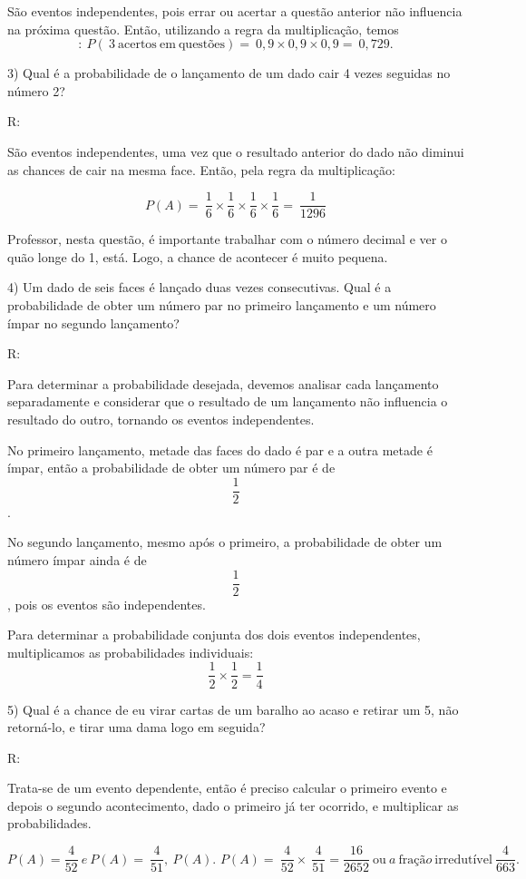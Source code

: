 São eventos independentes, pois errar ou acertar a questão anterior não
influencia na próxima questão. Então, utilizando a regra da
multiplicação, temos
\[:\ P(\ 3\ \text{acertos}\ \text{em}\ \text{quest}õ\text{es}) = \ 0,9 \times 0,9 \times 0,9 = \ 0,729.\]

3) Qual é a probabilidade de o lançamento de um dado cair 4 vezes
seguidas no número 2?

R:

São eventos independentes, uma vez que o resultado anterior do dado não
diminui as chances de cair na mesma face. Então, pela regra da
multiplicação:

\[P(A) = \ \frac{1}{6} \times \frac{1}{6} \times \frac{1}{6} \times \frac{1}{6} = \ \frac{1}{1296}\]

Professor, nesta questão, é importante trabalhar com o número decimal e
ver o quão longe do 1, está. Logo, a chance de acontecer é muito
pequena.

4) Um dado de seis faces é lançado duas vezes consecutivas. Qual é a
probabilidade de obter um número par no primeiro lançamento e um número
ímpar no segundo lançamento?

R:

Para determinar a probabilidade desejada, devemos analisar cada
lançamento separadamente e considerar que o resultado de um lançamento
não influencia o resultado do outro, tornando os eventos independentes.

No primeiro lançamento, metade das faces do dado é par e a outra metade
é ímpar, então a probabilidade de obter um número par é de
\[\frac {1}{2}\].

No segundo lançamento, mesmo após o primeiro, a probabilidade de obter
um número ímpar ainda é de \[\frac {1}{2}\], pois os eventos são
independentes.

Para determinar a probabilidade conjunta dos dois eventos independentes,
multiplicamos as probabilidades individuais:
\[\frac {1}{2} \times \frac {1}{2} = \frac {1}{4}\]

5) Qual é a chance de eu virar cartas de um baralho ao acaso e retirar
um 5, não retorná-lo, e tirar uma dama logo em seguida?

R:

Trata-se de um evento dependente, então é preciso calcular o primeiro
evento e depois o segundo acontecimento, dado o primeiro já ter
ocorrido, e multiplicar as probabilidades.

\[P\left( A \right) = \frac{4}{52}\ e\ P\left( A \right) = \ \frac{4}{51},\ P\left( A \right)\text{.\ }P\left( A \right) = \ \frac{4}{52} \times \ \frac{4}{51} = \frac{16}{2652}\ \text{ou}\ a\ \text{fra}ção\ \text{irredut}í\text{vel}\ \frac{4}{663}.\]

